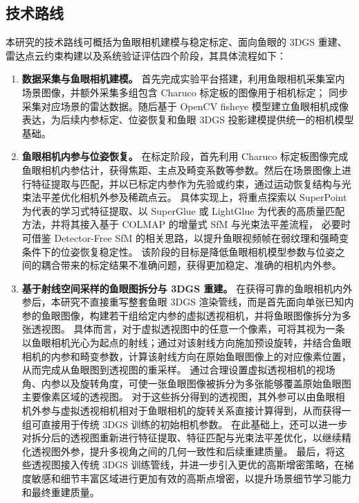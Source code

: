 \subsection{技术路线}

本研究的技术路线可概括为鱼眼相机建模与稳定标定、面向鱼眼的 3DGS 重建、雷达点云约束构建以及系统验证评估四个阶段，其具体流程如下：

\begin{enumerate}
    \item \textbf{数据采集与鱼眼相机建模。} 
    首先完成实验平台搭建，利用鱼眼相机采集室内场景图像，并额外采集多组包含 Charuco 标定板的图像用于相机标定；
    同步采集对应场景的雷达数据。随后基于 OpenCV fisheye 模型建立鱼眼相机成像表达，为后续内参标定、位姿恢复和鱼眼 3DGS 投影建模提供统一的相机模型基础。

    \item \textbf{鱼眼相机内参与位姿恢复。} 
    在标定阶段，首先利用 Charuco 标定板图像完成鱼眼相机内参估计，获得焦距、主点及畸变系数等参数。然后在场景图像上进行特征提取与匹配，并以已标定内参作为先验或约束，通过运动恢复结构与光束法平差优化相机外参及稀疏点云。
    具体实现上，将重点探索以 SuperPoint 为代表的学习式特征提取、以 SuperGlue 或 LightGlue 为代表的高质量匹配方法，并将其接入基于 COLMAP 的增量式 SfM 与光束法平差流程，
    必要时可借鉴 Detector-Free SfM 的相关思路，以提升鱼眼视频帧在弱纹理和强畸变条件下的位姿恢复稳定性。
    该阶段的目标是降低鱼眼相机模型参数与位姿之间的耦合带来的标定结果不准确问题，获得更加稳定、准确的相机内外参。

    \item \textbf{基于射线空间采样的鱼眼图拆分与 3DGS 重建。} 
    在获得可靠的鱼眼相机内外参后，本研究不直接重写整套鱼眼 3DGS 渲染管线，而是首先面向单张已知内参的鱼眼图像，构建若干组给定内参的虚拟透视相机，并将鱼眼图像拆分为多张透视图。
    具体而言，对于虚拟透视图中的任意一个像素，可将其视为一条以鱼眼相机光心为起点的射线；通过对该射线方向施加预设旋转，并结合鱼眼相机的内参和畸变参数，计算该射线方向在原始鱼眼图像上的对应像素位置，从而完成从鱼眼图到透视图的重采样。
    通过合理设置虚拟透视相机的视场角、内参以及旋转角度，可使一张鱼眼图像被拆分为多张能够覆盖原始鱼眼图主要像素区域的透视图。
    对于这些拆分得到的透视图，其外参可以由鱼眼相机外参与虚拟透视相机相对于鱼眼相机的旋转关系直接计算得到，从而获得一组可直接用于传统 3DGS 训练的初始相机参数。
    在此基础上，还可以进一步对拆分后的透视图重新进行特征提取、特征匹配与光束法平差优化，以继续精化透视图外参，提升多视角之间的几何一致性和后续重建质量。
    最后，将这些透视图接入传统 3DGS 训练管线，并进一步引入更优的高斯增密策略，在梯度敏感和细节丰富区域进行更加有效的高斯点增密，以提升场景细节学习能力和最终重建质量。


\end{enumerate}
